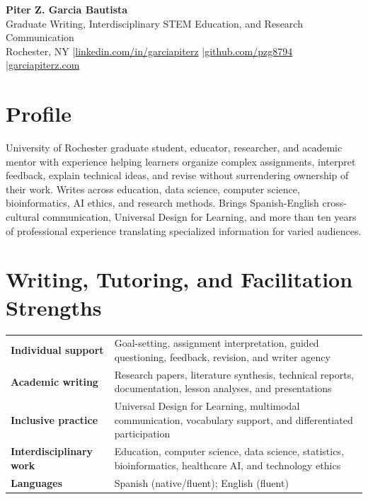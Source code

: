 \documentclass[10pt,letterpaper]{article}
\begin{document}
\fontsize{9.5}{11}\selectfont

\begin{center}
  {\Large\bfseries Piter Z. Garcia Bautista}\\[1pt]
  {\large Graduate Writing, Interdisciplinary STEM Education, and Research Communication}\\[2pt]
  Rochester, NY
  \enspace|\enspace \href{https://linkedin.com/in/garciapiterz}{linkedin.com/in/garciapiterz}
  \enspace|\enspace \href{https://github.com/pzg8794}{github.com/pzg8794}
  \enspace|\enspace \href{https://garciapiterz.com}{garciapiterz.com}
\end{center}

\section*{Profile}
University of Rochester graduate student, educator, researcher, and academic mentor with experience helping learners organize complex assignments, interpret feedback, explain technical ideas, and revise without surrendering ownership of their work. Writes across education, data science, computer science, bioinformatics, AI ethics, and research methods. Brings Spanish-English cross-cultural communication, Universal Design for Learning, and more than ten years of professional experience translating specialized information for varied audiences.

\section*{Writing, Tutoring, and Facilitation Strengths}
\begin{tabularx}{\textwidth}{@{}>{\bfseries}l X@{}}
Individual support & Goal-setting, assignment interpretation, guided questioning, feedback, revision, and writer agency\\
Academic writing & Research papers, literature synthesis, technical reports, documentation, lesson analyses, and presentations\\
Inclusive practice & Universal Design for Learning, multimodal communication, vocabulary support, and differentiated participation\\
Interdisciplinary work & Education, computer science, data science, statistics, bioinformatics, healthcare AI, and technology ethics\\
Languages & Spanish (native/fluent); English (fluent)\\
\end{tabularx}
\end{document}
